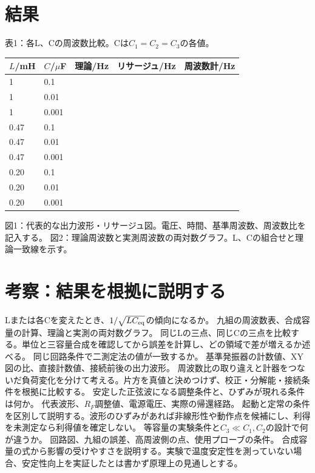 \documentclass[lualatex,a4paper,10pt]{jlreq}
\begin{document}
\section{結果}\label{sec:auto5}
表1：各L、Cの周波数比較。Cは$C_1=C_2=C_3$の各値。
\par\noindent\begin{tabularx}{\linewidth}{YYYYY}
\toprule $L$/mH & $C$/$\mu$F & 理論/Hz & リサージュ/Hz & 周波数計/Hz\\&0.1&&&\\1&0.01&&&\\1&0.001&&&\\
0.47&0.1&&&\\0.47&0.01&&&\\0.47&0.001&&&\\
0.20&0.1&&&\\0.20&0.01&&&\\0.20&0.001&&&\\\bottomrule
\end{tabularx}
図1：代表的な出力波形・リサージュ図。電圧、時間、基準周波数、周波数比を記入する。
\writing{40mm}
図2：理論周波数と実測周波数の両対数グラフ。L、Cの組合せと理論一致線を示す。
\writing{40mm}
\clearpage
\clearpage\section{考察：結果を根拠に説明する}\label{sec:auto6}
{Lまたは各Cを変えたとき、$1/\sqrt{LC_{\rm eq}}$の傾向になるか。}
{九組の周波数表、合成容量の計算、理論と実測の両対数グラフ。}
{同じLの三点、同じCの三点を比較する。単位と三容量合成を確認してから誤差を計算し、どの領域で差が増えるか述べる。}
{同じ回路条件で二測定法の値が一致するか。}
{基準発振器の計数値、XY図の比、直接計数値、接続前後の出力波形。}
{周波数比の取り違えと計器をつないだ負荷変化を分けて考える。片方を真値と決めつけず、校正・分解能・接続条件を根拠に比較する。}
{安定した正弦波になる調整条件と、ひずみが現れる条件は何か。}
{代表波形、$R_F$調整値、電源電圧、実際の帰還経路。}
{起動と定常の条件を区別して説明する。波形のひずみがあれば非線形性や動作点を候補にし、利得を未測定なら利得値を確定しない。}
{等容量の実験条件と$C_3\ll C_1,C_2$の設計で何が違うか。}
{回路図、九組の誤差、高周波側の点、使用プローブの条件。}
{合成容量の式から影響の受けやすさを説明する。実験で温度安定性を測っていない場合、安定性向上を実証したとは書かず原理上の見通しとする。}
\end{document}
